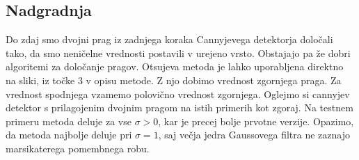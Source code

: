 \documentclass{article}
\begin{document}
    \subsection*{Nadgradnja}
    Do zdaj smo dvojni prag iz zadnjega koraka Cannyjevega detektorja določali tako, da smo neničelne vrednosti postavili v urejeno vrsto.
    Obstajajo pa že dobri algoritemi za določanje pragov. Otsujeva metoda je lahko uporabljena direktno na sliki, iz točke $3$ v
    opisu metode. Z njo dobimo vrednost zgornjega praga. Za vrednost spodnjega vzamemo polovično vrednost zgornjega. Oglejmo si cannyjev detektor
    s prilagojenim dvojnim pragom na istih primerih kot zgoraj. Na testnem primeru metoda deluje za vse $\sigma > 0$, kar je precej bolje
    prvotne verzije. Opazimo, da metoda najbolje deluje pri $\sigma = 1$, saj večja jedra Gaussovega filtra ne zaznajo marsikaterega pomembnega robu.  
\end{document}

